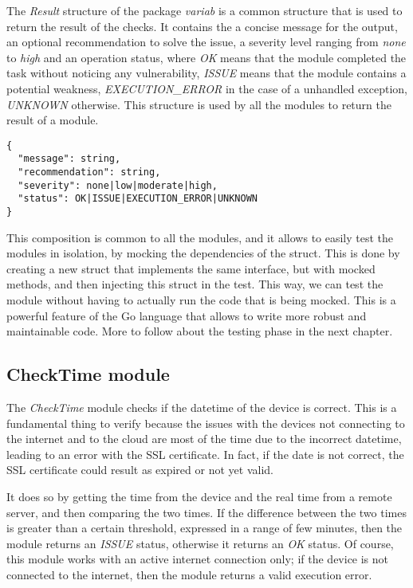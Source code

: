The \textit{Result} structure of the package \textit{variab} is a common structure that is used to return the result of the checks. It contains the a concise message for the output, an optional recommendation to solve the issue, a severity level ranging from \textit{none} to \textit{high} and an operation status, where \textit{OK} means that the module completed the task without noticing any vulnerability, \textit{ISSUE} means that the module contains a potential weakness, \textit{EXECUTION\_ERROR} in the case of a unhandled exception, \textit{UNKNOWN} otherwise. This structure is used by all the modules to return the result of a module.

\begin{lstlisting}[style=json, caption={Result struct}]
{
  "message": string,
  "recommendation": string,
  "severity": none|low|moderate|high,
  "status": OK|ISSUE|EXECUTION_ERROR|UNKNOWN
}
\end{lstlisting}

This composition is common to all the modules, and it allows to easily test the modules in isolation, by mocking the dependencies of the struct. This is done by creating a new struct that implements the same interface, but with mocked methods, and then injecting this struct in the test. This way, we can test the module without having to actually run the code that is being mocked. This is a powerful feature of the Go language that allows to write more robust and maintainable code. More to follow about the testing phase in the next chapter.

\subsection{CheckTime module}

The \textit{CheckTime} module checks if the datetime of the device is correct. This is a fundamental thing to verify because the issues with the devices not connecting to the internet and to the cloud are most of the time due to the incorrect datetime, leading to an error with the SSL certificate. In fact, if the date is not correct, the SSL certificate could result as expired or not yet valid.

It does so by getting the time from the device and the real time from a remote server, and then comparing the two times. If the difference between the two times is greater than a certain threshold, expressed in a range of few minutes, then the module returns an \textit{ISSUE} status, otherwise it returns an \textit{OK} status. Of course, this module works with an active internet connection only; if the device is not connected to the internet, then the module returns a valid execution error.

